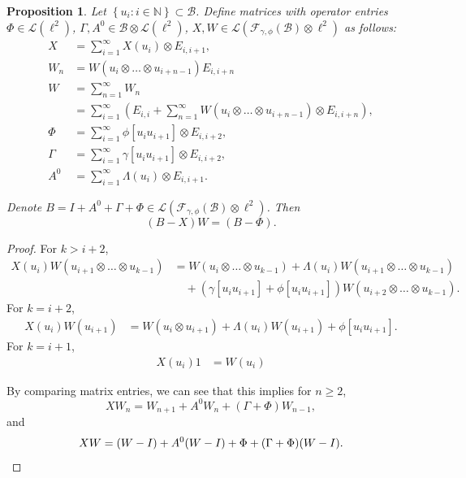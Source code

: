 \documentclass[12pt]{amsart}
\newtheorem{Prop}[Thm]{Proposition}
\theoremstyle{definition}
\newcommand{\set}[1]{\left\{#1\right\}}
\newcommand{\mf}[1]{\mathbb{#1}}
\newcommand{\mc}[1]{\mathcal{#1}}
\begin{document}
\begin{Prop}
\label{Prop:Infinite-W}
Let $\set{u_i : i \in \mf{N}} \subset \mc{B}$. Define matrices with operator entries $\Phi \in \mc{L}(\ell^2)$, $\Gamma, A^0 \in \mc{B} \otimes \mc{L}(\ell^2)$, $X, W \in \mc{L} (\mc{F}_{\gamma, \phi}(\mc{B}) \otimes \ell^2)$ as follows:
\begin{align*}
X &= \sum_{i=1}^\infty X(u_i) \otimes E_{i, i+1}, \\
W_n &= W(u_i\otimes \ldots\otimes u_{i+n-1}) E_{i, i+n} \\
W &= \sum_{n=1}^\infty W_n \\
&= \sum_{i=1}^\infty \left( E_{i, i} + \sum_{n=1}^\infty W(u_i \otimes \ldots \otimes u_{i+n-1}) \otimes E_{i, i + n} \right), \\
\Phi &= \sum_{i=1}^\infty \phi[u_i u_{i+1}] \otimes E_{i, i+2}, \\
\Gamma &= \sum_{i=1}^\infty \gamma[u_i u_{i+1}] \otimes E_{i, i+2}, \\
A^0 &= \sum_{i=1}^\infty \Lambda(u_i) \otimes E_{i, i+1}.
\end{align*}


Denote $B = I + A^0 + \Gamma + \Phi \in \mc{L} (\mc{F}_{\gamma, \phi}(\mc{B}) \otimes \ell^2)$. Then
\[
(B - X) W = (B - \Phi).
\]
\end{Prop}


\begin{proof}
For $k > i+2$,
\[
\begin{split}
X(u_i) W(u_{i+1} \otimes \ldots \otimes u_{k-1})
& = W(u_i \otimes \ldots \otimes  u_{k-1}) + \Lambda(u_i) W(u_{i+1} \otimes \ldots \otimes u_{k-1}) \\
&\quad + (\gamma[u_i u_{i+1}] + \phi[u_i u_{i+1}]) W(u_{i+2} \otimes \ldots \otimes u_{k-1}).
\end{split}
\]
For $k = i+2$,
\[
\begin{split}
X(u_i) W(u_{i+1})
& = W(u_i \otimes u_{i+1}) + \Lambda(u_i) W(u_{i+1}) + \phi[u_i u_{i+1}].
\end{split}
\]
For $k = i+1$,
\[
\begin{split}
X(u_i) 1
& = W(u_i)
\end{split}
\]

By comparing matrix entries, we can see that this implies for $n \geq 2$,
\begin{equation*}
X W_n = W_{n+1} + A^0 W_n + (\Gamma + \Phi) W_{n-1},
\end{equation*}
and
\begin{equation}
\label{Eq:Matricial-recursion}
X W = (W - I) + A^0 (W - I) + \Phi + (\Gamma + \Phi) (W - I). \qedhere
\end{equation}
\end{proof}
\end{document}

